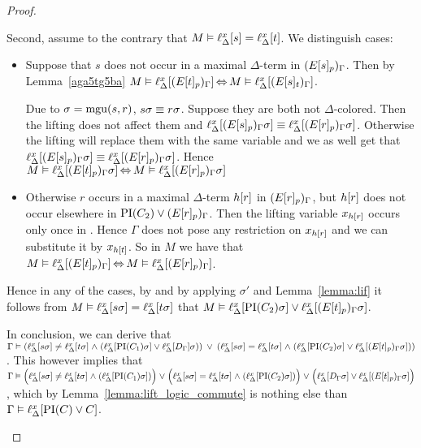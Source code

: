 {\begin{proof}
\begin{description}
\begin{enumerate}
					Second, assume to the contrary that $M \vDash \ell_{\Delta}^{x}[s] = \ell_{\Delta}^{x}[t]$.
					We distinguish cases:
					\begin{itemize}
						\item
							Suppose that $s$ does not occur in a maximal $\Delta$-term in $(E{[s]_{p}})_\Gamma$.
							Then by Lemma~\ref{aga5tg5ba} $M\vDash \ell_{\Delta}^{x}[(E{[t]_{p}})_\Gamma] \operatorname{\Leftrightarrow} M \vDash \ell_{\Delta}^{x}[(E{[s]_{t}})_\Gamma]$.

							Due to $\sigma=\operatorname{mgu}(s, r)$, $s\sigma \equiv r\sigma$.
							Suppose they are both not $\Delta$-colored.
							Then the lifting does not affect them and 
							$\ell_{\Delta}^{x}[(E{[s]_{p}})_\Gamma\sigma] \equiv \ell_{\Delta}^{x}[(E{[r]_{p}})_\Gamma\sigma]$.
							Otherwise the lifting will replace them with the same variable and we as well get that
							$\ell_{\Delta}^{x}[(E{[s]_{p}})_\Gamma\sigma] \equiv \ell_{\Delta}^{x}[(E{[r]_{p}})_\Gamma\sigma]$.
							Hence $M\vDash \ell_{\Delta}^{x}[(E{[t]_{p}})_\Gamma\sigma] \operatorname{\Leftrightarrow}\allowbreak M\vDash 
							\ell_{\Delta}^{x}[(E{[r]_{p}})_\Gamma\sigma]$

						\item
							Otherwise $r$ occurs in a maximal $\Delta$-term $h[r]$ in $(E{[r]_{p}})_\Gamma$, but $h[r]$ does not occur elsewhere in $\operatorname{PI}(C_2) \lor (E{[r]_{p}})_\Gamma$.
							Then the lifting variable $x_{h[r]}$ occurs only once in \markB{}.
							Hence $\Gamma$ does not pose any restriction on $x_{h[r]}$ and we can substitute it by $x_{h[t]}$. 
							So in $M$ we have that $M\vDash \ell_{\Delta}^{x}[(E{[t]_{p}})_\Gamma] \operatorname{\Leftrightarrow}\allowbreak M\vDash \ell_{\Delta}^{x}[(E{[r]_{p}})_\Gamma]$.

					\end{itemize}

					Hence in any of the cases, by \markB{} and by applying $\sigma'$ and Lemma~\ref{lemma:lif}
					it follows from $M\vDash \ell_{\Delta}^{x}[s\sigma] = \ell_{\Delta}^{x}[t\sigma]$ 
					that $M \vDash \ell_{\Delta}^{x}[\operatorname{PI}(C_2)\sigma] \lor \ell_{\Delta}^{x}[(E{[t]_{p}})_\Gamma\sigma]$. 
					\medskip

					In conclusion, we can derive that 
					$\Gamma \vDash
					(\ell_{\Delta}^{x}[s\sigma] \neq \ell_{\Delta}^{x}[t\sigma] \;{\land}\;\allowbreak (\ell_{\Delta}^{x}[\operatorname{PI}(C_1)\sigma] \lor \ell_{\Delta}^{x}[D_\Gamma]\sigma))
					\;\,{\lor}\;\,\allowbreak
					(\ell_{\Delta}^{x}[s\sigma] = \ell_{\Delta}^{x}[t\sigma] \;{\land}\; (\ell_{\Delta}^{x}[\operatorname{PI}(C_2)\sigma] \lor \ell_{\Delta}^{x}[(E{[t]_{p}})_\Gamma\sigma]))$.
					This however implies that
					$\Gamma \entails
					\Big(\lifdelta{s\sigma} \neq \lifdelta{t\sigma} \spas\land (\lifdelta{\PI(C_1)\sigma} )\Big)
					\spas{\lor}\allowbreak
					\Big(\lifdelta{s\sigma} =\nolinebreak \lifdelta{t\sigma} \spas\land (\lifdelta{\PI(C_2)\sigma}) \Big)
					\spas\lor\allowbreak \Big(\lifdelta{D_\Gamma\sigma} \lor \lifdelta{(E\occat{t}{p})_\Gamma\sigma}\Big)$, 
					which by Lemma~\ref{lemma:lift_logic_commute} is nothing else than
					$\Gamma \vDash \ell_{\Delta}^{x}[\operatorname{PI}(C) \lor C]$.


\end{enumerate}
\end{description}
\end{proof}}
